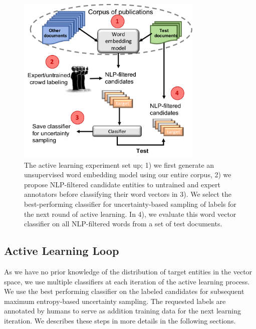 \begin{figure}
\centering
\includegraphics[trim=0.15in 0.1in 0in 0.in,clip,width=3.5in]{figures/al_setup.pdf}
\caption{\label{fig:current} The active learning experiment set up; 1) we first generate an unsupervised word embedding model using our entire corpus, 2) we propose NLP-filtered candidate entities to untrained and expert annotators before classifying their word vectors in 3). We select the best-performing classifier for uncertainty-based sampling of labels for the next round of active learning. In 4), we evaluate this word vector classifier on all NLP-filtered words from a set of test documents. 
}
\end{figure}

\subsection{Active Learning Loop}
As we have no prior knowledge of the distribution of target entities in the vector space, 
we use multiple classifiers at each iteration of the active learning process. 
We use the best performing classifier on the labeled candidates for subsequent maximum entropy-based uncertainty sampling. 
The requested labels are annotated by humans to serve as addition training data for the next learning iteration. 
We describes these steps in more details in the following sections.

